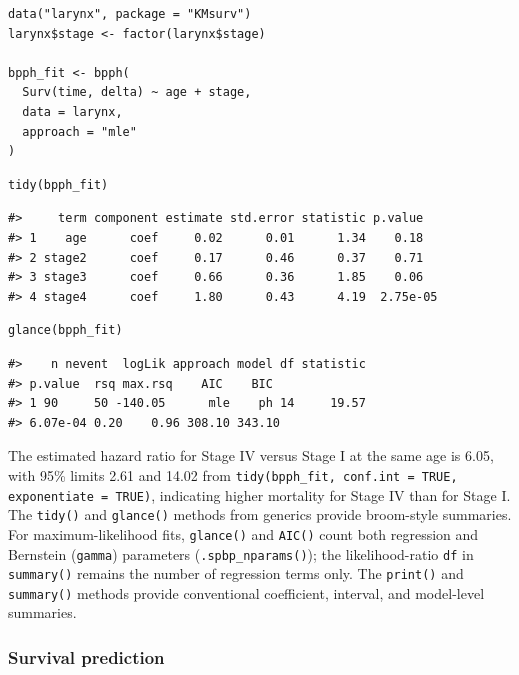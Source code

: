 \documentclass[5p,lefttitle]{elsarticle}
\providecommand{\pkg}[1]{\textsf{#1}}
\begin{document}
{{\footnotesize\begin{verbatim}
data("larynx", package = "KMsurv")
larynx$stage <- factor(larynx$stage)

bpph_fit <- bpph(
  Surv(time, delta) ~ age + stage,
  data = larynx,
  approach = "mle"
)
\end{verbatim}}

{\footnotesize\begin{verbatim}
tidy(bpph_fit)
\end{verbatim}}

{\footnotesize\begin{verbatim}
#>     term component estimate std.error statistic p.value
#> 1    age      coef     0.02      0.01      1.34    0.18
#> 2 stage2      coef     0.17      0.46      0.37    0.71
#> 3 stage3      coef     0.66      0.36      1.85    0.06
#> 4 stage4      coef     1.80      0.43      4.19  2.75e-05
\end{verbatim}}

{\footnotesize\begin{verbatim}
glance(bpph_fit)
\end{verbatim}}

{\footnotesize\begin{verbatim}
#>    n nevent  logLik approach model df statistic
#> p.value  rsq max.rsq    AIC    BIC
#> 1 90     50 -140.05      mle    ph 14     19.57
#> 6.07e-04 0.20    0.96 308.10 343.10
\end{verbatim}}


The estimated hazard ratio for Stage IV versus Stage I at the same age
is 6.05, with 95\% limits 2.61
and 14.02 from \texttt{tidy(bpph\_fit, conf.int = TRUE, exponentiate = TRUE)},
indicating higher mortality for Stage IV than for Stage
I. The \texttt{tidy()} and \texttt{glance()} methods from \pkg{generics} provide
broom-style summaries. For maximum-likelihood fits, \texttt{glance()} and \texttt{AIC()}
count both regression and Bernstein (\texttt{gamma}) parameters
(\texttt{.spbp\_nparams()}); the likelihood-ratio \texttt{df} in
\texttt{summary()} remains the number of regression terms only.
The \texttt{print()} and \texttt{summary()} methods provide conventional
coefficient, interval, and model-level summaries.

\subsubsection{Survival prediction}\label{survival-prediction}

}
\end{document}
